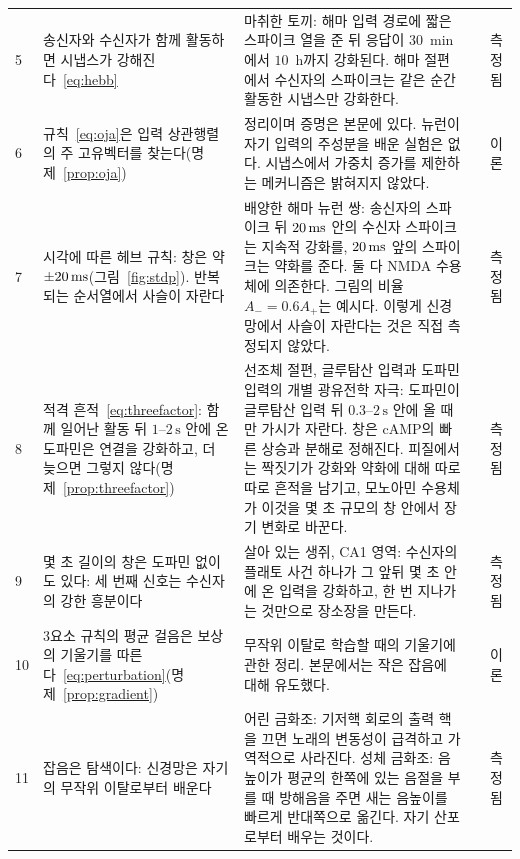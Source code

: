 {\begin{longtable}{>{\raggedright}p{0.5cm}>{\raggedright}p{4.0cm}>{\raggedright}p{5.6cm}>{\raggedright}p{2.3cm}>{\raggedright\arraybackslash}p{1.7cm}}
5 & 송신자와 수신자가 함께 활동하면 시냅스가 강해진다~\eqref{eq:hebb} & 마취한 토끼: 해마 입력 경로에 짧은 스파이크 열을 준 뒤 응답이 $30$~min에서 $10$~h까지 강화된다. 해마 절편에서 수신자의 스파이크는 같은 순간 활동한 시냅스만 강화한다. & \cite{Bliss1973LTP, Kelso1986hebb} & 측정됨 \\
6 & 규칙~\eqref{eq:oja}은 입력 상관행렬의 주 고유벡터를 찾는다(명제~\ref{prop:oja}) & 정리이며 증명은 본문에 있다. 뉴런이 자기 입력의 주성분을 배운 실험은 없다. 시냅스에서 가중치 증가를 제한하는 메커니즘은 밝혀지지 않았다. & \cite{Oja1982} & 이론 \\
7 & 시각에 따른 헤브 규칙: 창은 약 $\pm20\,\text{ms}$(그림~\ref{fig:stdp}). 반복되는 순서열에서 사슬이 자란다 & 배양한 해마 뉴런 쌍: 송신자의 스파이크 뒤 $20\,\text{ms}$ 안의 수신자 스파이크는 지속적 강화를, $20\,\text{ms}$ 앞의 스파이크는 약화를 준다. 둘 다 NMDA 수용체에 의존한다. 그림의 비율 $A_-=0.6A_+$는 예시다. 이렇게 신경망에서 사슬이 자란다는 것은 직접 측정되지 않았다. & \cite{BiPoo1998} & 측정됨 \\
8 & 적격 흔적~\eqref{eq:threefactor}: 함께 일어난 활동 뒤 $1$--$2\,\text{s}$ 안에 온 도파민은 연결을 강화하고, 더 늦으면 그렇지 않다(명제~\ref{prop:threefactor}) & 선조체 절편, 글루탐산 입력과 도파민 입력의 개별 광유전학 자극: 도파민이 글루탐산 입력 뒤 $0.3$--$2\,\text{s}$ 안에 올 때만 가시가 자란다. 창은 cAMP의 빠른 상승과 분해로 정해진다. 피질에서는 짝짓기가 강화와 약화에 대해 따로따로 흔적을 남기고, 모노아민 수용체가 이것을 몇 초 규모의 창 안에서 장기 변화로 바꾼다. & \cite{Yagishita2014, He2015eligibility} & 측정됨 \\
9 & 몇 초 길이의 창은 도파민 없이도 있다: 세 번째 신호는 수신자의 강한 흥분이다 & 살아 있는 생쥐, CA1 영역: 수신자의 플래토 사건 하나가 그 앞뒤 몇 초 안에 온 입력을 강화하고, 한 번 지나가는 것만으로 장소장을 만든다. & \cite{Bittner2017} & 측정됨 \\
10 & 3요소 규칙의 평균 걸음은 보상의 기울기를 따른다~\eqref{eq:perturbation}(명제~\ref{prop:gradient}) & 무작위 이탈로 학습할 때의 기울기에 관한 정리. 본문에서는 작은 잡음에 대해 유도했다. & \cite{Williams1992} & 이론 \\
11 & 잡음은 탐색이다: 신경망은 자기의 무작위 이탈로부터 배운다 & 어린 금화조: 기저핵 회로의 출력 핵을 끄면 노래의 변동성이 급격하고 가역적으로 사라진다. 성체 금화조: 음높이가 평균의 한쪽에 있는 음절을 부를 때 방해음을 주면 새는 음높이를 빠르게 반대쪽으로 옮긴다. 자기 산포로부터 배우는 것이다. & \cite{Olveczky2005, TumerBrainard2007} & 측정됨 \\

\end{longtable}}
